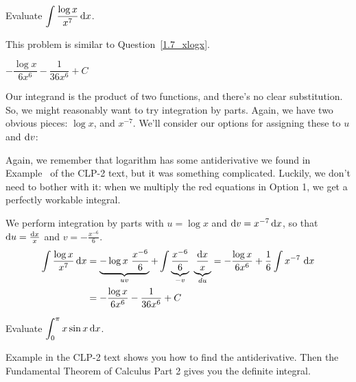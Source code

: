 \begin{question}[M105 2013A]\label{1.7_xlogx2}
Evaluate ${\displaystyle\int \frac{\log x}{x^7}\,\mathrm{d}x}$.
\end{question}

\begin{hint}
This problem is similar to Question~\ref{1.7_xlogx}.
\end{hint}

\begin{answer}
$- \dfrac{\log x}{6 x^6} - \dfrac{1}{36 x^6} + C$
\end{answer}

\begin{solution}
Our integrand is the product of two functions, and there's no clear substitution. So, we might reasonably want to try integration by parts. Again, we have two obvious pieces: $\log x$, and $x^{-7}$. We'll consider our options for assigning these to $u$ and $\mathrm{d}v$:


Again, we remember that logarithm has some antiderivative we found in Example~ of the CLP-2 text, but it was something complicated. Luckily, we don't need to bother with it: when we multiply the red equations in Option 1, we get a perfectly workable integral.

We perform integration by parts with $u=\log x$ and $\mathrm{d}v=x^{-7}\,\mathrm{d}x$,
so that $\mathrm{d}u=\frac{\mathrm{d}x}{x}$ and $v = -\frac{x^{-6}}{6}$.
\begin{align*}
\int \frac{\log x}{x^7}\,\mathrm{d}x
   &=\underbrace{ -\log x\ \frac{x^{-6}}{6}}_{uv} + \int \underbrace{\frac{x^{-6}}{6}}_{-v}\ \underbrace{\frac{\mathrm{d}x}{x}}_{du}
    = - \frac{\log x}{6 x^6} +\frac{1}{6} \int x^{-7} \ \mathrm{d}x \\
   &= - \frac{\log x}{6 x^6} - \frac{1}{36 x^6} + C
\end{align*}
\end{solution}

\begin{Mquestion}[2016A]\label{1.7_xsinx}
Evaluate $\displaystyle\int_0^\pi x\sin x\,\mathrm{d}x$.
\end{Mquestion}

\begin{hint}
 Example  in the
CLP-2 text shows you how to find the antiderivative. Then the Fundamental Theorem of Calculus Part 2 gives you the definite integral.
\end{hint}

